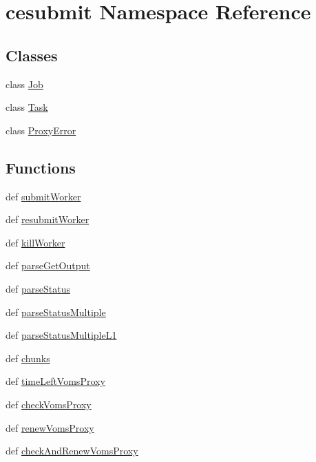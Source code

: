 \section{cesubmit Namespace Reference}
\label{namespacecesubmit}
\subsection*{Classes}
\begin{DoxyCompactItemize}
\item 
class \hyperlink{classcesubmit_1_1Job}{Job}
\item 
class \hyperlink{classcesubmit_1_1Task}{Task}
\item 
class \hyperlink{classcesubmit_1_1ProxyError}{Proxy\-Error}
\end{DoxyCompactItemize}
\subsection*{Functions}
\begin{DoxyCompactItemize}
\item 
def \hyperlink{namespacecesubmit_abb80ff80fdc177d56f824e38a22e24e5}{submit\-Worker}
\item 
def \hyperlink{namespacecesubmit_a6f195d9e0170719ea641a8e4c1779ee5}{resubmit\-Worker}
\item 
def \hyperlink{namespacecesubmit_a3c0034bc61b8d04d824ce99d141e7561}{kill\-Worker}
\item 
def \hyperlink{namespacecesubmit_ac91881b33d31ee2421f420db0779e105}{parse\-Get\-Output}
\item 
def \hyperlink{namespacecesubmit_aef733725d5239bd53cbebad35b6f2fbb}{parse\-Status}
\item 
def \hyperlink{namespacecesubmit_af047bf976baeed01419a83aa2c518c17}{parse\-Status\-Multiple}
\item 
def \hyperlink{namespacecesubmit_a31adc55fc9847e01b60c6a5d5674c6bb}{parse\-Status\-Multiple\-L1}
\item 
def \hyperlink{namespacecesubmit_aeab38202bd4efdfecb032386ccd8daa0}{chunks}
\item 
def \hyperlink{namespacecesubmit_a56b28526cc992b27b06992c2d2e4e0fa}{time\-Left\-Voms\-Proxy}
\item 
def \hyperlink{namespacecesubmit_ad1499246a43768c1b7dcaa69ac63ebe9}{check\-Voms\-Proxy}
\item 
def \hyperlink{namespacecesubmit_a40ba814b5c5329a08c5bf5e9d3ffedf5}{renew\-Voms\-Proxy}
\item 
def \hyperlink{namespacecesubmit_a758ea16460878c94db900ede6f582920}{check\-And\-Renew\-Voms\-Proxy}
\end{DoxyCompactItemize}
